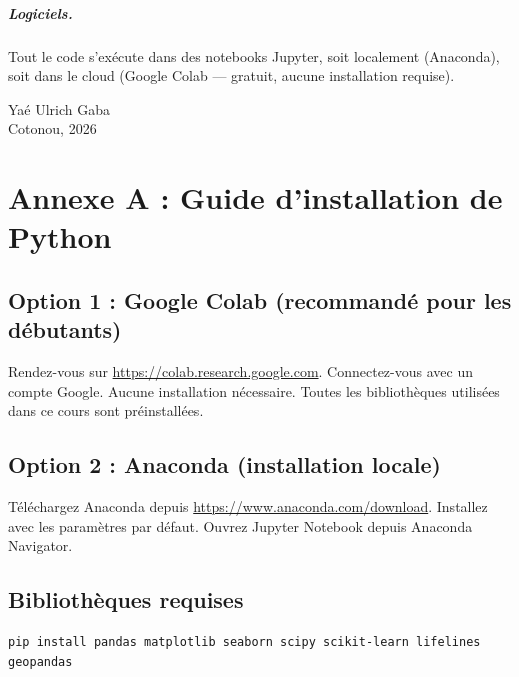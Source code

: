 \documentclass[12pt,a4paper,twoside]{book}
\begin{document}
\paragraph{Logiciels.} Tout le code s'ex\'ecute dans des notebooks Jupyter, soit localement (Anaconda), soit dans le cloud (Google Colab --- gratuit, aucune installation requise).

\vfill
\noindent Yaé Ulrich Gaba\\
Cotonou, 2026

\mainmatter












\backmatter

\chapter*{Annexe A : Guide d'installation de Python}

\section*{Option 1 : Google Colab (recommand\'e pour les d\'ebutants)}
Rendez-vous sur \url{https://colab.research.google.com}. Connectez-vous avec un compte Google. Aucune installation n\'ecessaire. Toutes les biblioth\`eques utilis\'ees dans ce cours sont pr\'einstall\'ees.

\section*{Option 2 : Anaconda (installation locale)}
T\'el\'echargez Anaconda depuis \url{https://www.anaconda.com/download}. Installez avec les param\`etres par d\'efaut. Ouvrez Jupyter Notebook depuis Anaconda Navigator.

\section*{Biblioth\`eques requises}
\begin{verbatim}
pip install pandas matplotlib seaborn scipy scikit-learn lifelines geopandas
\end{verbatim}
\end{document}
